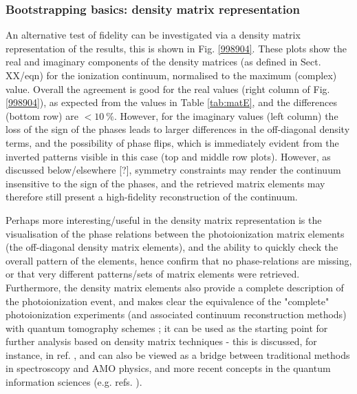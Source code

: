 \subsubsection{Bootstrapping basics: density matrix representation}

An alternative test of fidelity can be investigated via a density matrix representation of the results, this is shown in Fig. \ref{998904}. These plots show the real and imaginary components of the density matrices (as defined in Sect. XX/eqn) for the ionization continuum, normalised to the maximum (complex) value. Overall the agreement is good for the real values (right column of Fig. \ref{998904}), as expected from the values in Table \ref{tab:matE}, and the differences (bottom row) are $<10~\%$. However, for the imaginary values (left column) the loss of the sign of the phases leads to larger differences in the off-diagonal density terms, and the possibility of phase flips, which is immediately evident from the inverted patterns visible in this case (top and middle row plots). However, as discussed below/elsewhere [?], symmetry constraints may render the continuum insensitive to the sign of the phases, and the retrieved matrix elements may therefore still present a high-fidelity reconstruction of the continuum.

Perhaps more interesting/useful in the density matrix representation is the visualisation of the phase relations between the photoionization matrix elements (the off-diagonal density matrix elements), and the ability to quickly check the overall pattern of the elements, hence confirm that no phase-relations are missing, or that very different patterns/sets of matrix elements were retrieved. Furthermore, the density matrix elements also provide a complete description of the photoionization event, and makes clear the equivalence of the "complete" photoionization experiments (and associated continuum reconstruction methods) with quantum tomography schemes \cite{MauroDAriano2003}; it can be used as the starting point for further analysis based on density matrix techniques - this is discussed, for instance, in ref. \cite{BlumDensityMat}, and can also be viewed as a bridge between traditional methods in spectroscopy and AMO physics, and more recent concepts in the quantum information sciences (e.g. refs.  \cite{Tichy2011a,Yuen-Zhou2014}).

